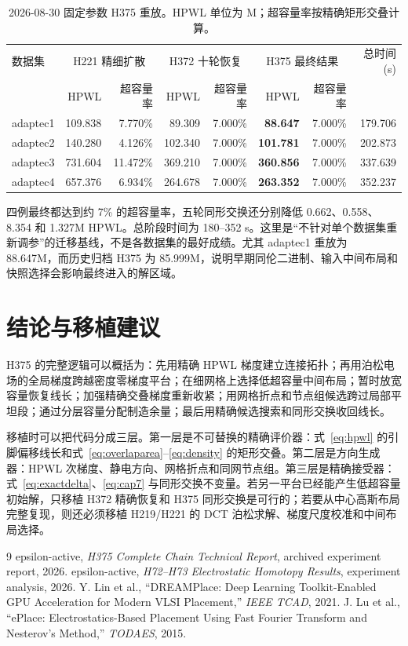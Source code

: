 \documentclass[UTF8,a4paper,11pt]{ctexrep}
\begin{document}
\begin{table}[H]
\centering\small
\caption{2026-08-30 固定参数 H375 重放。HPWL 单位为 M；超容量率按精确矩形交叠计算。}\label{tab:replay}
\begin{tabular}{lrrrrrrr}
\toprule
数据集 & \multicolumn{2}{c}{H221 精细扩散} & \multicolumn{2}{c}{H372 十轮恢复} & \multicolumn{2}{c}{H375 最终结果} & 总时间 (s)\\
 & HPWL & 超容量率 & HPWL & 超容量率 & HPWL & 超容量率 & \\\midrule
adaptec1 & 109.838 & 7.770\% & 89.309 & 7.000\% & \textbf{88.647} & 7.000\% & 179.706\\
adaptec2 & 140.280 & 4.126\% & 102.340 & 7.000\% & \textbf{101.781} & 7.000\% & 202.873\\
adaptec3 & 731.604 & 11.472\% & 369.210 & 7.000\% & \textbf{360.856} & 7.000\% & 337.639\\
adaptec4 & 657.376 & 6.934\% & 264.678 & 7.000\% & \textbf{263.352} & 7.000\% & 352.237\\
\bottomrule
\end{tabular}
\end{table}

四例最终都达到约 7\% 的超容量率，五轮同形交换还分别降低 0.662、0.558、8.354 和 1.327M HPWL。总阶段时间为 180--352 s。这里是“不针对单个数据集重新调参”的迁移基线，不是各数据集的最好成绩。尤其 adaptec1 重放为 88.647M，而历史归档 H375 为 85.999M，说明早期同伦二进制、输入中间布局和快照选择会影响最终进入的解区域。

\chapter{结论与移植建议}
H375 的完整逻辑可以概括为：先用精确 HPWL 梯度建立连接拓扑；再用泊松电场的全局梯度跨越密度零梯度平台；在细网格上选择低超容量中间布局；暂时放宽容量恢复线长；加强精确交叠梯度重新收紧；用网格折点和节点组候选跨过局部平坦段；通过分层容量分配制造余量；最后用精确候选搜索和同形交换收回线长。

移植时可以把代码分成三层。第一层是不可替换的精确评价器：式~\eqref{eq:hpwl} 的引脚偏移线长和式~\eqref{eq:overlaparea}--\eqref{eq:density} 的矩形交叠。第二层是方向生成器：HPWL 次梯度、静电方向、网格折点和同网节点组。第三层是精确接受器：式~\eqref{eq:exactdelta}、\eqref{eq:cap7} 与同形交换不变量。若另一平台已经能产生低超容量初始解，只移植 H372 精确恢复和 H375 同形交换是可行的；若要从中心高斯布局完整复现，则还必须移植 H219/H221 的 DCT 泊松求解、梯度尺度校准和中间布局选择。

\begin{thebibliography}{9}
 epsilon-active, \emph{H375 Complete Chain Technical Report}, archived experiment report, 2026.
 epsilon-active, \emph{H72--H73 Electrostatic Homotopy Results}, experiment analysis, 2026.
 Y. Lin et al., ``DREAMPlace: Deep Learning Toolkit-Enabled GPU Acceleration for Modern VLSI Placement,'' \emph{IEEE TCAD}, 2021.
 J. Lu et al., ``ePlace: Electrostatics-Based Placement Using Fast Fourier Transform and Nesterov's Method,'' \emph{TODAES}, 2015.
\end{thebibliography}
\end{document}
